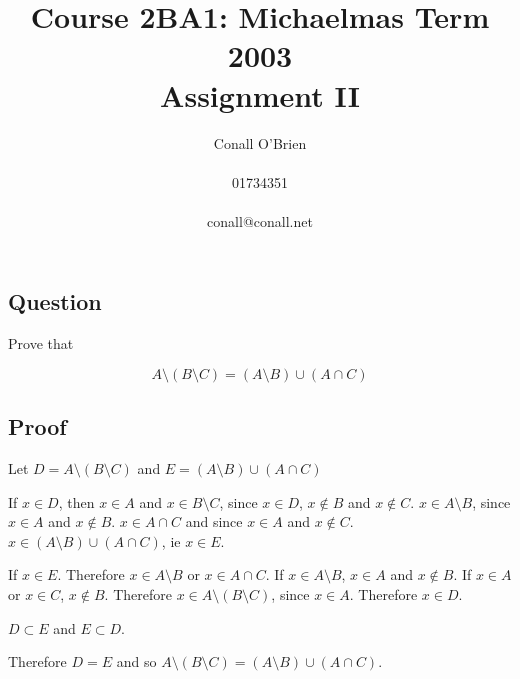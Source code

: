 \documentclass[a4paper,12pt]{article}
\begin{document}
\title{Course 2BA1: Michaelmas Term 2003 \\ Assignment II}

\author{Conall O'Brien \\ \\ 01734351 \\ \\ conall@conall.net}

\maketitle

\section{}

\subsection*{Question}

Prove that

\[ A \setminus (B \setminus C) = (A \setminus B) \cup (A \cap C) \]

\subsection*{Proof}

Let $D = A \setminus (B \setminus C)$ and $E = (A \setminus B) \cup (A
\cap C)$

\vspace{10mm}

\noindent If $x \in D$, then $x \in A$ and $x \in B \setminus C$, since
$x \in D$, $x \not\in B$ and $x \not\in C$. $x \in A \setminus B$, since 
$x \in A$ and $x \not\in B$. $x \in A \cap C$ and since $x \in A$ and 
$x \not\in C$. $x \in (A \setminus B) \cup (A \cap C)$, ie $x \in E$.

\vspace{10mm}

\noindent If $x \in E$. Therefore $x \in A \setminus B$ or $x \in A \cap
C$. If $x \in A \setminus B$, $x \in A$ and $x \not\in B$. If $x \in A $
or $x \in C$, $x \not\in B$. Therefore $x \in A \setminus (B \setminus
C)$, since $x \in A$. Therefore $x \in D$.

\vspace{10mm}

\noindent $ D \subset E$ and $E \subset D$.

\noindent Therefore $D = E$ and so $A \setminus (B \setminus C) = (A
\setminus B) \cup (A \cap C)$.
\end{document}
